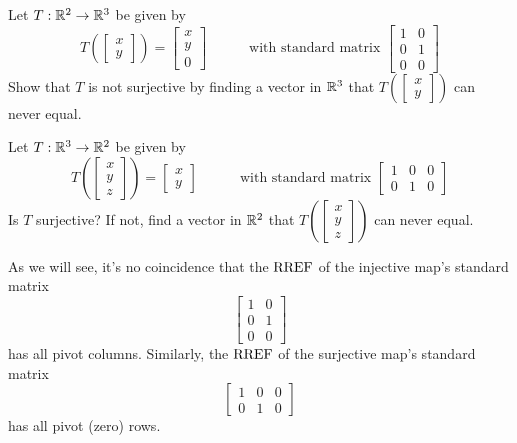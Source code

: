 \begin{applicationActivities}
\begin{activity}{3}
Let $T: \mathbb{R}^2 \rightarrow \mathbb{R}^3$ be given by
\[
  T\left(\begin{bmatrix}x \\ y \end{bmatrix} \right)
    =
  \begin{bmatrix} x \\ y \\ 0 \end{bmatrix}
    \hspace{3em}
    \text{with standard matrix }
  \begin{bmatrix} 1 & 0 \\ 0 & 1 \\ 0 & 0 \end{bmatrix}
\]
Show that \(T\) is not surjective by finding a vector in \(\mathbb{R}^3\) that
\(T\left(\begin{bmatrix}x \\ y \end{bmatrix} \right)\) can never equal.
\end{activity}

\begin{activity}{2}
Let $T: \mathbb{R}^3 \rightarrow \mathbb{R}^2$ be given by
\[
  T\left(\begin{bmatrix}x \\ y\\z \end{bmatrix} \right)
    =
  \begin{bmatrix} x \\ y \end{bmatrix}
    \hspace{3em}
    \text{with standard matrix }
  \begin{bmatrix} 1 & 0 & 0 \\ 0 & 1 & 0 \end{bmatrix}
\]
Is $T$ surjective? If not, find a vector in \(\mathbb{R}^2\) that
\(T\left(\begin{bmatrix}x \\ y \\z\end{bmatrix} \right)\) can never equal.
\end{activity}

\begin{observation}
As we will see, it's no coincidence that the \(\operatorname{RREF}\) of the
injective map's standard matrix
\[
  \begin{bmatrix} 1 & 0 \\ 0 & 1 \\ 0 & 0 \end{bmatrix}
\]
has all pivot columns. Similarly, the \(\operatorname{RREF}\) of the surjective map's
standard matrix
\[
  \begin{bmatrix} 1 & 0 & 0 \\ 0 & 1 & 0 \end{bmatrix}
\]
has all pivot (zero) rows.
\end{observation}



\end{applicationActivities}
